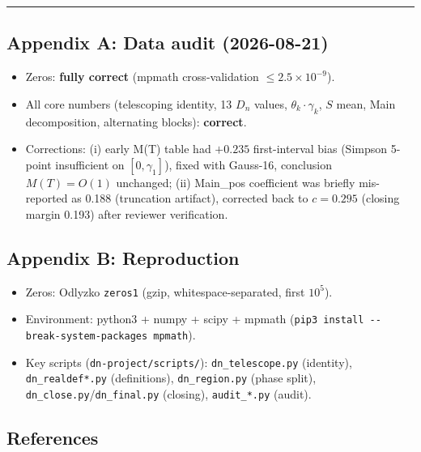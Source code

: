 \documentclass[
]{article}
\providecommand{\tightlist}{%
  \setlength{\itemsep}{0pt}\setlength{\parskip}{0pt}}
\begin{document}
\begin{center}\rule{0.5\linewidth}{0.5pt}\end{center}

\hypertarget{appendix-a-data-audit-2026-08-21}{%
\subsection{Appendix A: Data audit
(2026-08-21)}\label{appendix-a-data-audit-2026-08-21}}

\begin{itemize}
\tightlist
\item
  Zeros: \textbf{fully correct} (mpmath cross-validation
  \(\le 2.5\times10^{-9}\)).
\item
  All core numbers (telescoping identity, 13 \(D_n\) values,
  \(\theta_k\cdot\gamma_k\), \(S\) mean, Main decomposition, alternating
  blocks): \textbf{correct}.
\item
  Corrections: (i) early M(T) table had \(+0.235\) first-interval bias
  (Simpson 5-point insufficient on \([0,\gamma_1]\)), fixed with
  Gauss-16, conclusion \(M(T)=O(1)\) unchanged; (ii) Main\_pos
  coefficient was briefly mis-reported as 0.188 (truncation artifact),
  corrected back to \(c = 0.295\) (closing margin 0.193) after reviewer
  verification.
\end{itemize}

\hypertarget{appendix-b-reproduction}{%
\subsection{Appendix B: Reproduction}\label{appendix-b-reproduction}}

\begin{itemize}
\tightlist
\item
  Zeros: Odlyzko \texttt{zeros1} (gzip, whitespace-separated, first
  \(10^5\)).
\item
  Environment: python3 + numpy + scipy + mpmath
  (\texttt{pip3\ install\ -\/-break-system-packages\ mpmath}).
\item
  Key scripts (\texttt{dn-project/scripts/}): \texttt{dn\_telescope.py}
  (identity), \texttt{dn\_realdef*.py} (definitions),
  \texttt{dn\_region.py} (phase split),
  \texttt{dn\_close.py}/\texttt{dn\_final.py} (closing),
  \texttt{audit\_*.py} (audit).
\end{itemize}

\hypertarget{references}{%
\subsection{References}\label{references}}
\end{document}
